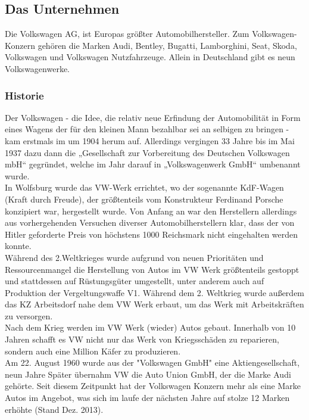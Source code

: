 \documentclass[12pt]{article}
\begin{document}
	\subsection{Das Unternehmen}
	Die Volkswagen AG, ist Europas größter Automobilhersteller. Zum Volkswagen-Konzern gehören die Marken Audi, Bentley, Bugatti, Lamborghini, Seat, Skoda, Volkswagen und Volkswagen Nutzfahrzeuge. Allein in Deutschland gibt es neun Volkswagenwerke.
	
	\subsubsection{Historie}
	Der Volkswagen - die Idee, die relativ neue Erfindung der Automobilität in Form eines Wagens der für den kleinen Mann bezahlbar sei an selbigen zu bringen - kam erstmals im um 1904 herum auf. Allerdings vergingen 33 Jahre bis im Mai 1937 dazu dann die „Gesellschaft zur Vorbereitung des Deutschen Volkswagen mbH“ gegründet, welche im Jahr darauf in „Volkswagenwerk GmbH“ umbenannt wurde.\cite{vwchronik} \\
	In Wolfsburg wurde das VW-Werk errichtet, wo der sogenannte KdF-Wagen (Kraft durch Freude), der größtenteils vom Konstrukteur Ferdinand Porsche konzipiert war, hergestellt wurde. Von Anfang an war den Herstellern allerdings aus vorhergehenden Versuchen diverser Automobilherstellern klar, dass der von Hitler geforderte Preis von höchstens 1000 Reichsmark nicht eingehalten werden konnte. \cite{geschdautos}\\
	Während des 2.Weltkrieges wurde aufgrund von neuen Prioritäten und Ressourcenmangel die Herstellung von Autos im VW Werk größtenteils gestoppt und stattdessen auf Rüstungsgüter umgestellt, unter anderem auch auf Produktion der Vergeltungswaffe V1.\cite{autowp} Während dem 2. Weltkrieg wurde außerdem das KZ Arbeitsdorf nahe dem VW Werk erbaut, um das Werk mit Arbeitskräften zu versorgen.\cite{terror}  
	\\
	Nach dem Krieg werden im VW Werk (wieder) Autos gebaut. Innerhalb von 10 Jahren schafft es VW nicht nur das Werk von Kriegsschäden zu reparieren, sondern auch eine Million Käfer zu produzieren. \cite{ahwest}\\
	Am 22. August 1960 wurde aus der "Volkswagen GmbH" eine Aktiengesellschaft, neun Jahre Später übernahm VW die Auto Union GmbH, der die Marke Audi gehörte. Seit diesem Zeitpunkt hat der Volkswagen Konzern mehr als eine Marke Autos im Angebot, was sich im laufe der nächsten Jahre auf stolze 12 Marken erhöhte (Stand Dez. 2013). \cite{vwag}
\end{document}
